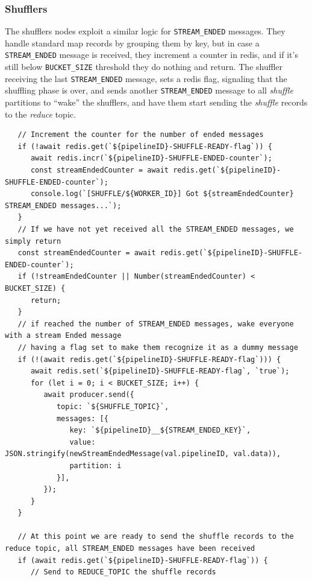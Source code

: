 \subsubsection{Shufflers}
The shufflers nodes exploit a similar logic for \lstinline|STREAM_ENDED| messages. 
They handle standard map records by grouping them by key, but in case a \lstinline|STREAM_ENDED| message is received, they increment a counter in redis, and if it's still below \lstinline|BUCKET_SIZE| threshold they do nothing and return.
The shuffler receiving the last \lstinline|STREAM_ENDED| message, sets a redis flag, signaling that the shuffling phase is over, and sends another \lstinline|STREAM_ENDED| message to all \textit{shuffle} partitions to ``wake'' the shufflers, and have them start sending the \textit{shuffle} records to the \textit{reduce} topic.

\begin{lstlisting}
   // Increment the counter for the number of ended messages
   if (!await redis.get(`${pipelineID}-SHUFFLE-READY-flag`)) {
      await redis.incr(`${pipelineID}-SHUFFLE-ENDED-counter`);
      const streamEndedCounter = await redis.get(`${pipelineID}-SHUFFLE-ENDED-counter`);
      console.log(`[SHUFFLE/${WORKER_ID}] Got ${streamEndedCounter} STREAM_ENDED messages...`);
   }
   // If we have not yet received all the STREAM_ENDED messages, we simply return
   const streamEndedCounter = await redis.get(`${pipelineID}-SHUFFLE-ENDED-counter`);
   if (!streamEndedCounter || Number(streamEndedCounter) < BUCKET_SIZE) {
      return;
   }
   // if reached the number of STREAM_ENDED messages, wake everyone with a stream Ended message 
   // having a flag set to make them recognize it as a dummy message
   if (!(await redis.get(`${pipelineID}-SHUFFLE-READY-flag`))) {
      await redis.set(`${pipelineID}-SHUFFLE-READY-flag`, `true`);
      for (let i = 0; i < BUCKET_SIZE; i++) {
         await producer.send({
            topic: `${SHUFFLE_TOPIC}`,
            messages: [{
               key: `${pipelineID}__${STREAM_ENDED_KEY}`,
               value: JSON.stringify(newStreamEndedMessage(val.pipelineID, val.data)),
               partition: i
            }],
         });
      }
   }
  
   // At this point we are ready to send the shuffle records to the reduce topic, all STREAM_ENDED messages have been received
   if (await redis.get(`${pipelineID}-SHUFFLE-READY-flag`)) {
      // Send to REDUCE_TOPIC the shuffle records
\end{lstlisting}

